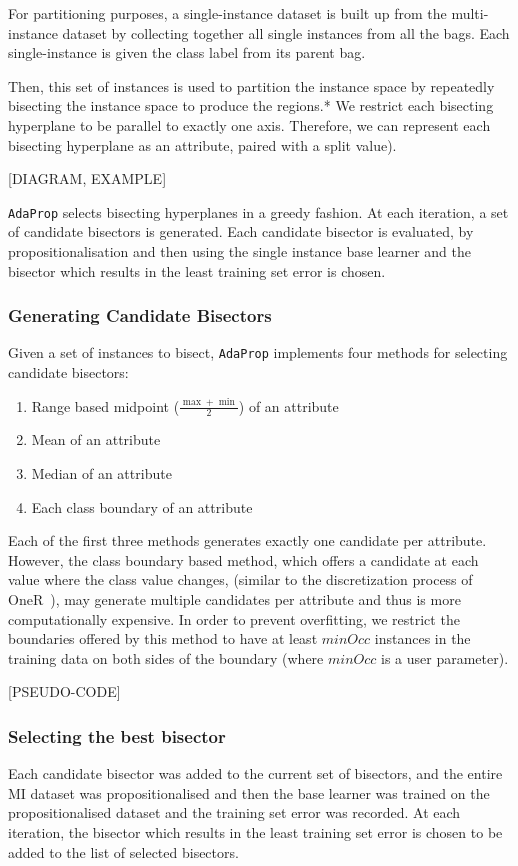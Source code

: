 \documentclass[a4paper,12pt]{article} %
\newcommand{\AdaProp}{\texttt{AdaProp}\xspace}
\begin{document}
For partitioning purposes,
    a single-instance dataset is built up from the multi-instance dataset
    by collecting together all single instances from all the bags.
Each single-instance is given the class label from its parent bag.

Then, this set of instances is used to partition the instance space by
    repeatedly bisecting the instance space
    to produce the regions.*
We restrict each bisecting hyperplane to be parallel to exactly one axis.
Therefore, we can represent each bisecting hyperplane as an attribute,
    paired with a split value).
    
[DIAGRAM, EXAMPLE]

\AdaProp selects bisecting hyperplanes in a greedy fashion. 
At each iteration, a set of candidate bisectors is generated.
Each candidate bisector is evaluated, 
    by propositionalisation and then using the single instance base learner
    and the bisector which results in the least training set error is chosen.
    
\subsubsection{Generating Candidate Bisectors}

Given a set of instances to bisect, 
    \AdaProp implements four methods for selecting candidate bisectors:
\begin{enumerate}
\item Range based midpoint ($\frac{\max+\min}{2}$) of an attribute
\item Mean of an attribute
\item Median of an attribute
\item Each class boundary of an attribute 
\end{enumerate}

Each of the first three methods generates exactly one candidate per attribute.
However, the class boundary based method, 
    which offers a candidate at each value where the class value changes,
    (similar to the discretization process of OneR~\cite{holte}), 
    may generate multiple candidates per attribute and 
    thus is more computationally expensive.
In order to prevent overfitting, 
    we restrict the boundaries offered by this method to have at least $minOcc$ instances
    in the training data on both sides of the boundary 
    (where $minOcc$ is a user parameter).

[PSEUDO-CODE]

\subsubsection{Selecting the best bisector}
Each candidate bisector was added to the current set of bisectors,
    and the entire MI dataset was propositionalised and then
    the base learner was trained on the propositionalised dataset
    and the training set error was recorded.
At each iteration, the bisector which results in the least training set error 
    is chosen to be added to the list of selected bisectors.
\end{document}
